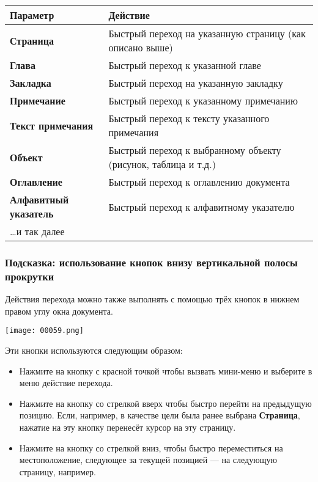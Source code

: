 ﻿\documentclass[a4paper,10pt]{article}
\begin{document}
\begin{center}
\begin{tabular}{ | m{5cm} | m{9cm} | }
\hline
 \textbf{Параметр} & \textbf{Действие} \\ 
 \hline
 \textbf{Страница} & Быстрый переход на указанную страницу (как описано выше)\\
\hline
\textbf{Глава} & Быстрый переход к указанной главе\\
\hline
\textbf{Закладка} & Быстрый переход на указанную закладку\\
\hline
\textbf{Примечание} & Быстрый переход к указанному примечанию\\
\hline
\textbf{Текст примечания} & Быстрый переход к тексту указанного примечания\\
\hline
\textbf{Объект} & Быстрый переход к выбранному объекту (рисунок, таблица и т.д.)\\
\hline
\textbf{Оглавление} & Быстрый переход к оглавлению документа\\
\hline
\textbf{Алфавитный указатель} & Быстрый переход к алфавитному указателю\\
\hline
…и так далее &  \\
\hline
\end{tabular}
\end{center}

\subsubsection{Подсказка: использование кнопок внизу вертикальной полосы прокрутки}
Действия перехода можно также выполнять с помощью трёх кнопок в нижнем правом углу окна документа.

\texttt{[image: 00059.png]}

Эти кнопки используются следующим образом:
\begin{itemize}
 \item Нажмите на кнопку с красной точкой чтобы вызвать мини-меню и выберите в меню действие перехода.
 \item Нажмите на кнопку со стрелкой вверх чтобы быстро перейти на предыдущую позицию. Если, например, в качестве цели была ранее выбрана \textbf{Страница}, нажатие на эту кнопку перенесёт курсор на эту страницу.
 \item Нажмите на кнопку со стрелкой вниз, чтобы быстро переместиться на местоположение, следующее за текущей позицией — на следующую страницу, например.
\end{itemize}
\end{document}
